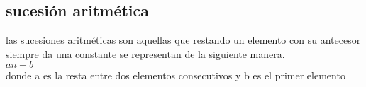 \subsection{sucesión aritmética}
las sucesiones aritméticas son aquellas que restando un elemento con su antecesor siempre da una constante se representan de la siguiente manera.
\\$ an+b$
\\donde a es la resta entre dos elementos consecutivos y b es el primer elemento